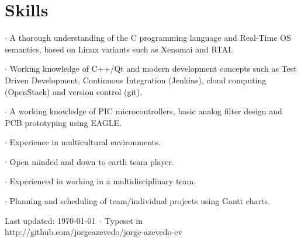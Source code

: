 \section*{Skills}

{
 $\cdot$ A thorough understanding of the C programming language and Real-Time OS
semantics, based on Linux variants such as Xenomai and RTAI.

 $\cdot$ Working knowledge of C++/Qt and modern development concepts such as
Test Driven Development, Continuous Integration (Jenkins), cloud computing
(OpenStack) and version control (git).
}
{
 $\cdot$ A working knowledge of PIC microcontrollers, basic analog filter design and PCB
prototyping using EAGLE.
}
{
 $\cdot$ Experience in multicultural environments. 

 $\cdot$ Open minded and down to earth team player.

}
{

 $\cdot$ Experienced in working in a multidisciplinary team.

 $\cdot$ Planning and scheduling of team/individual projects using Gantt charts.
}


\vfill

\begin{center}
{
    \scriptsize  Last updated: \today ~$\cdot$ Typeset in \XeLaTeX\\
    http://github.com/jorgeazevedo/jorge-azevedo-cv
}

\end{center}

